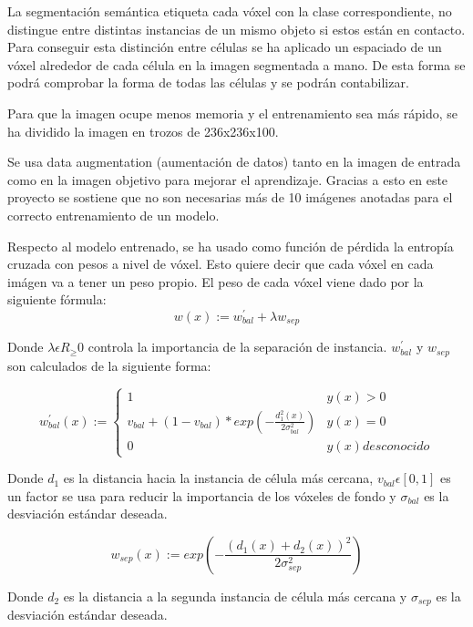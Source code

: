 La segmentación semántica etiqueta cada vóxel con la clase correspondiente, no distingue entre distintas instancias de un mismo objeto si estos están en contacto. Para conseguir esta distinción entre células se ha aplicado un espaciado de un vóxel alrededor de cada célula en la imagen segmentada a mano. De esta forma se podrá comprobar la forma de todas las células y se podrán contabilizar.

Para que la imagen ocupe menos memoria y el entrenamiento sea más rápido, se ha dividido la imagen en trozos de 236x236x100. 

Se usa data augmentation (aumentación de datos) tanto en la imagen de entrada como en la imagen objetivo para mejorar el aprendizaje. Gracias a esto en este proyecto se sostiene que no son necesarias más de 10 imágenes anotadas para el correcto entrenamiento de un modelo.

Respecto al modelo entrenado, se ha usado como función de pérdida la entropía cruzada con pesos a nivel de vóxel. Esto quiere decir que cada vóxel en cada imágen va a tener un peso propio. El peso de cada vóxel viene dado por la siguiente fórmula:
\begin{equation}
w(x):=w^{'}_{bal}+\lambda w_{sep}
\end{equation}

Donde $\lambda \epsilon R_{\geq}0$ controla la importancia de la separación de instancia. $w^{'}_{bal}$ y $w_{sep}$
son calculados de la siguiente forma:

\begin{equation}
w^{'}_{bal}(x):= \left \{ \begin{matrix} 1 & y(x)>0
\\ v_{bal}+(1-v_{bal})*exp(-\frac{d^2_1(x)}{2\sigma^2_{bal}}) & y(x)=0
\\ 0 & y(x) desconocido \end{matrix}\right. 
\end{equation}

Donde $d_1$ es la distancia hacia la instancia de célula más cercana, $v_{bal}\epsilon [0,1]$ es un factor se usa para reducir la importancia de los vóxeles de fondo y $\sigma_{bal}$ es la desviación estándar deseada.

\begin{equation}
w_{sep}(x) := exp(-\frac{(d_1(x)+d_2(x))^2}{2\sigma_{sep}^2})
\end{equation}

Donde $d_2$ es la distancia a la segunda instancia de célula más cercana y $\sigma_{sep}$ es la desviación estándar deseada. 


